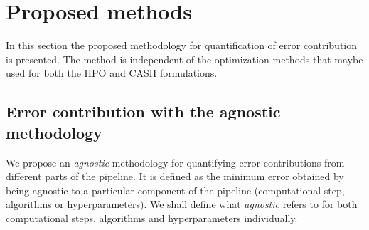 \section{Proposed methods}
\label{sec3}
In this section the proposed methodology for quantification of error contribution is presented. The method is independent of the optimization methods that maybe used for both the HPO and CASH formulations.

\subsection{Error contribution with the agnostic methodology}
\label{EQ}

We propose an \textit{agnostic} methodology for quantifying error contributions from different parts of the pipeline. It is defined as the minimum error obtained by being agnostic to a particular component of the pipeline (computational step, algorithms or hyperparameters). We shall define what \textit{agnostic} refers to for both computational steps, algorithms and hyperparameters individually.

